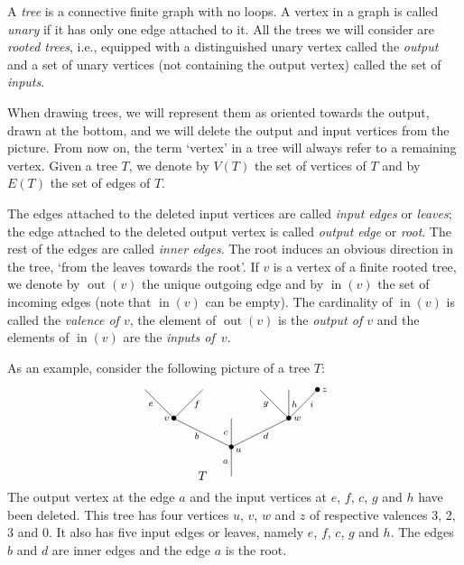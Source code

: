 \documentclass[a4paper]{amsart}
\theoremstyle{plain}
\theoremstyle{definition}
\theoremstyle{remark}
\DeclareMathOperator{\out}{out} \DeclareMathOperator{\inn}{in}
\numberwithin{equation}{section}
\numberwithin{figure}{section}
\begin{document}
A \emph{tree} is a connective finite graph with no loops. A
vertex in a graph is called \emph{unary} if it has only one edge
attached to it. All the trees we will consider are \emph{rooted trees}, i.e., equipped
with a distinguished unary vertex called the \emph{output} and a set of unary vertices (not containing the output vertex)
called the set of \emph{inputs}.

When drawing trees, we will represent them as oriented towards the output, drawn at the bottom, and we will delete the
output and input vertices from the picture. From now on, the term `vertex' in a tree will always refer to a
remaining vertex. Given a tree $T$, we denote by $V(T)$ the set of vertices of $T$ and by $E(T)$ the set of edges of $T$.

The edges attached to the deleted input vertices are called \emph{input edges}
or \emph{leaves}; the edge attached to the deleted output vertex is called \emph{output edge} or \emph{root}. The rest of
the edges are called \emph{inner edges}. The root induces an obvious direction in the tree, `from the leaves towards the
root'. If $v$ is a vertex of a finite rooted tree, we denote by $\out(v)$ the unique
outgoing edge and by $\inn(v)$ the set of incoming edges (note that $\inn(v)$ can be empty).
The cardinality of $\inn(v)$ is called the \emph{valence of $v$}, the element of $\out(v)$ is the
\emph{output of $v$} and the elements of $\inn(v)$ are the \emph{inputs of~$v$}.

As an example, consider the following picture of a tree $T$:

\begin{equation}
    \xy
    <0.08cm, 0cm>:
    (0,-15)*{}="1";
    (0,-5)*=0{\bullet}="2";
    (-20,5)*=0{\bullet}="3";
    (0,5)*=0{}="4";
    (20,5)*=0{\bullet}="5";
    (-30,15)*{}="6";
    (-10,15)*{}="7";
    (10,15)*{}="8";
    (20,15)*{}="9";
    (30,15)*=0{\bullet}="10";
    (-2,-10)*=0{\scriptstyle a};
    (2.5,-6)*=0{\scriptstyle u};
    (-2,0)*=0{\scriptstyle c};
    (-22.5,5)*=0{\scriptstyle v};
    (23,5)*=0{\scriptstyle w};
    (-28,10)*=0{\scriptstyle e};
    (28,10)*=0{\scriptstyle i};
    (-12,10)*=0{\scriptstyle f};
    (12,-1)*=0{\scriptstyle d};
    (-12,-1)*=0{\scriptstyle b};
    (12,10)*=0{\scriptstyle g};
    (22,10)*=0{\scriptstyle h};
    (32.5,15)*=0{\scriptstyle z};
    (-10,-15)*{T};
    "1";"2" **\dir{-};
    "2";"3" **\dir{-};
    "2";"4"
    **\dir{-};
    "2";"5" **\dir{-};
    "3";"6" **\dir{-};
    "3";"7" **\dir{-};
    "5";"8" **\dir{-};
    "5";"9" **\dir{-};
    "5";"10" **\dir{-};
    \endxy
    \label{treeexample}
\end{equation}
The output vertex at the edge $a$ and the input vertices at $e$, $f$, $c$, $g$ and $h$ have been deleted.
This tree has four vertices $u$, $v$, $w$ and $z$ of respective valences 3, 2, 3 and 0. It also has five input
edges or leaves, namely $e$, $f$, $c$, $g$ and $h$. The edges $b$ and $d$ are inner edges and the edge $a$ is the root.
\end{document}
